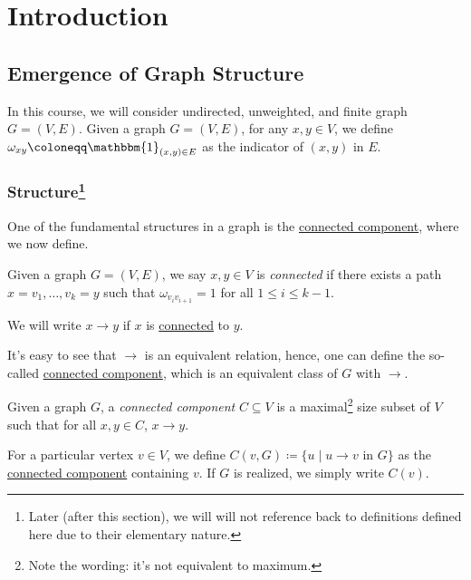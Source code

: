 \chapter{Introduction}

\section{Emergence of Graph Structure}
In this course, we will consider undirected, unweighted, and finite graph \(G = (V, E)\). Given a graph \(G = (V, E)\), for any \(x, y \in V\), we define \(\omega _{xy} \coloneqq \mathbbm{1}_{(x, y) \in E} \) as the indicator of \((x, y)\) in \(E\).

\subsection[Structure]{Structure\protect\footnote{Later (after this section), we will will not reference back to definitions defined here due to their elementary nature.}}
One of the fundamental structures in a graph is the \hyperref[def:connected-component]{connected component}, where we now define.

\begin{definition}[Connected]\label{def:connected}
	Given a graph \(G = (V, E)\), we say \(x, y \in V\) is \emph{connected} if there exists a path \(x = v_1, \dots, v_k = y\) such that \(\omega _{v_i v_{i+1}} = 1\) for all \(1 \leq i \leq k-1\).
\end{definition}

\begin{notation}
	We will write \(x \to y\) if \(x\) is \hyperref[def:connected]{connected} to \(y\).
\end{notation}

It's easy to see that \(\to \) is an equivalent relation, hence, one can define the so-called \hyperref[def:connected-component]{connected component}, which is an equivalent class of \(G\) with \(\to \).

\begin{definition}\label{def:connected-component}
	Given a graph \(G\), a \emph{connected component} \(C \subseteq V\) is a maximal\footnote{Note the wording: it's not equivalent to maximum.} size subset of \(V\) such that for all \(x, y \in C\), \(x \to y\).
\end{definition}

\begin{notation}
	For a particular vertex \(v \in V\), we define \(C(v, G) \coloneqq \{ u \mid u \to v \text{ in } G\} \) as the \hyperref[def:connected-component]{connected component} containing \(v\). If \(G\) is realized, we simply write \(C(v)\).
\end{notation}

